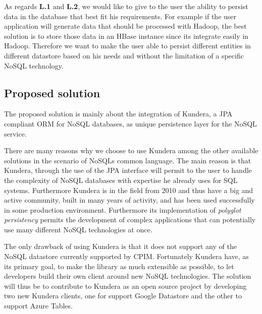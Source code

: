 \newparagraph As regards \textbf{L.1} and \textbf{L.2}, we would like to  give to the user the ability to persist data in the database that best fit his requirements. For example if the user application will generate data that should be processed with Hadoop, the best solution is to store those data in an HBase instance since its integrate easily in Hadoop. Therefore we want to make the user able to persist different entities in different datastore based on his needs and without the limitation of a specific NoSQL technology.

\subsection{Proposed solution}
The proposed solution is mainly about the integration of Kundera, a JPA compliant ORM for NoSQL databases, as unique persistence layer for the NoSQL service. 

\noindent There are many reasons why we choose to use Kundera among the other available solutions in the scenario of NoSQLs common language. The main reason is that Kundera, through the use of the JPA interface will permit to the user to handle the complexity of NoSQL databases with expertise he already uses for SQL systems. Furthermore Kundera is in the field from 2010 and thus have a big and active community, built in many years of activity, and has been used successfully in some production environment. Furthermore its implementation of \textit{polyglot persistency} permits the development of complex applications that can potentially use many different NoSQL technologies at once.

\noindent The only drawback of using Kundera is that it does not support any of the NoSQL datastore currently supported by CPIM. Fortunately Kundera have, as its primary goal, to make the library as much extensible as possible, to let developers build their own client around new NoSQL technologies. The solution will thus be to contribute to Kundera as an open source project by developing two new Kundera clients, one for support Google Datastore and the other to support Azure Tables.

